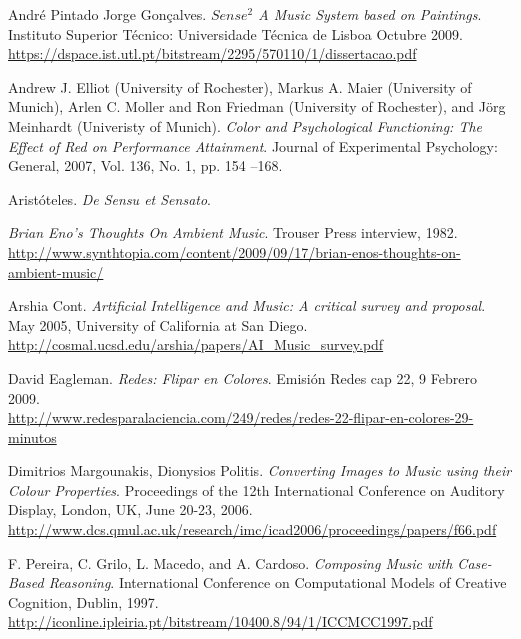 \begin{thebibliography}{9}

  André Pintado Jorge Gonçalves. \emph{$Sense^{2}$ A Music System based on Paintings}. Instituto Superior Técnico: Universidade Técnica de Lisboa Octubre 2009.\\
 \url{https://dspace.ist.utl.pt/bitstream/2295/570110/1/dissertacao.pdf}
 
  Andrew J. Elliot (University of Rochester), Markus A. Maier (University of Munich), Arlen C. Moller and Ron Friedman (University of Rochester), and Jörg Meinhardt (Univeristy of Munich). \emph{Color and Psychological Functioning: The Effect of Red on Performance Attainment}. Journal of Experimental Psychology: General, 2007, Vol. 136, No. 1, pp. 154 –168.

 Aristóteles. \emph{De Sensu et Sensato}.

 \emph{Brian Eno's Thoughts On Ambient Music}. Trouser Press interview, 1982. \\
 \url{http://www.synthtopia.com/content/2009/09/17/brian-enos-thoughts-on-ambient-music/}

 Arshia Cont. \emph{Artificial Intelligence and Music: A critical survey and proposal}. May 2005, University of California at San Diego.\\
 \url{http://cosmal.ucsd.edu/arshia/papers/AI_Music_survey.pdf}

 David Eagleman. \emph{Redes: Flipar en Colores}. Emisión Redes cap 22, 9 Febrero 2009.\\
 \url{http://www.redesparalaciencia.com/249/redes/redes-22-flipar-en-colores-29-minutos}

 Dimitrios Margounakis, Dionysios Politis. \emph{Converting Images to Music using their Colour Properties}. Proceedings of the 12th International Conference on Auditory Display, London, UK, June 20-23, 2006.\\
 \url{http://www.dcs.qmul.ac.uk/research/imc/icad2006/proceedings/papers/f66.pdf}

 F. Pereira, C. Grilo, L. Macedo, and A. Cardoso. \emph{Composing Music with Case-Based Reasoning}. International Conference on Computational Models of Creative Cognition, Dublin, 1997.
 \url{http://iconline.ipleiria.pt/bitstream/10400.8/94/1/ICCMCC1997.pdf}


\end{thebibliography}
